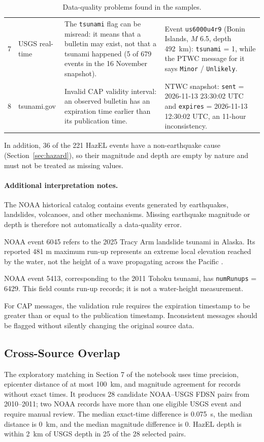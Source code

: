 \documentclass[a4paper,11pt,oneside]{book}
\begin{document}
\begin{table}[H]
\begin{tabularx}{\textwidth}{@{}c>{\raggedright\arraybackslash}p{2.1cm}>{\raggedright\arraybackslash}X>{\raggedright\arraybackslash}X@{}}
7 & USGS real-time & The \texttt{tsunami} flag can be misread: it means that a bulletin may exist, not that a tsunami happened (5 of 679 events in the 16 November snapshot). & Event \texttt{us6000u4r9} (Bonin Islands, $M$ 6.5, depth 492~km): \texttt{tsunami} = 1, while the PTWC message for it says \texttt{Minor} / \texttt{Unlikely}. \\
8 & tsunami.gov &
Invalid CAP validity interval: an observed bulletin has an
expiration time earlier than its publication time. &
NTWC snapshot: \texttt{sent} =
2026-11-13 23:30:02 UTC and \texttt{expires} =
2026-11-13 12:30:02 UTC, an 11-hour inconsistency. \\
\bottomrule
\end{tabularx}
\caption{Data-quality problems found in the samples.}
\label{tab:quality}
\end{table}

In addition, 36 of the 221 HazEL events have a non-earthquake cause (Section~\ref{sec:hazard}), so their magnitude and depth are empty by nature and must not be treated as missing values.
\paragraph{Additional interpretation notes.}

The NOAA historical catalog contains events generated by
earthquakes, landslides, volcanoes, and other mechanisms.
Missing earthquake magnitude or depth is therefore not
automatically a data-quality error.

NOAA event 6045 refers to the 2025 Tracy Arm landslide tsunami
in Alaska. Its reported 481 m maximum run-up represents an
extreme local elevation reached by the water, not the height
of a wave propagating across the Pacific \cite{tracy}.

NOAA event 5413, corresponding to the 2011 Tohoku tsunami,
has \texttt{numRunups} = 6429. This field counts run-up records;
it is not a water-height measurement.

For CAP messages, the validation rule requires the expiration
timestamp to be greater than or equal to the publication
timestamp. Inconsistent messages should be flagged without
silently changing the original source data.

\subsection{Cross-Source Overlap}
\label{sec:overlap}
The exploratory matching in Section 7 of the notebook uses time precision, epicenter distance of at most 100~km, and magnitude agreement for records without exact times. It produces 28 candidate NOAA--USGS FDSN pairs from 2010--2011; two NOAA records have more than one eligible USGS event and require manual review. The median exact-time difference is 0.075~s, the median distance is 0~km, and the median magnitude difference is 0. HazEL depth is within 2~km of USGS depth in 25 of the 28 selected pairs.
\end{document}
